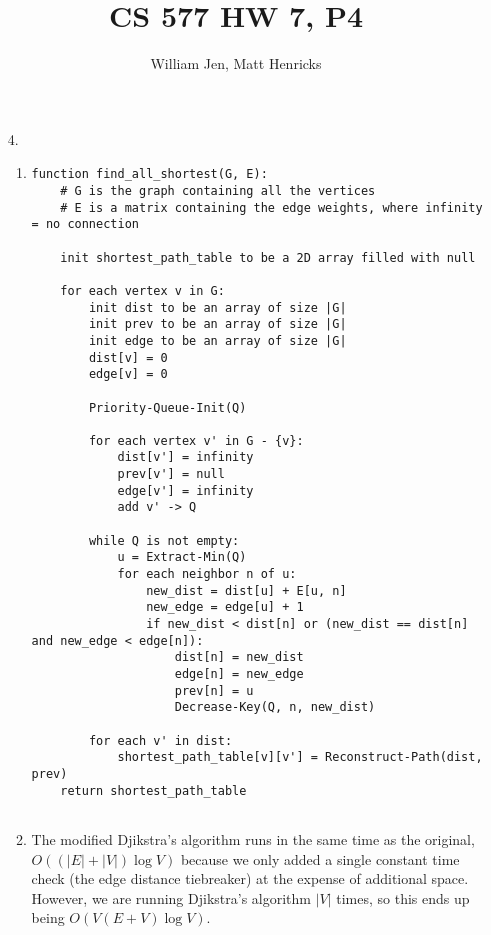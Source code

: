 \documentclass{article}
\title{CS 577 HW 7, P4}
\author{William Jen, Matt Henricks}
\date{}
\begin{document}
\maketitle

\begin{enumerate}
    \item[4.]
        \begin{enumerate}
            \item
                \begin{verbatim}
function find_all_shortest(G, E):
    # G is the graph containing all the vertices
    # E is a matrix containing the edge weights, where infinity = no connection

    init shortest_path_table to be a 2D array filled with null

    for each vertex v in G:
        init dist to be an array of size |G|
        init prev to be an array of size |G|
        init edge to be an array of size |G|
        dist[v] = 0
        edge[v] = 0
        
        Priority-Queue-Init(Q)
        
        for each vertex v' in G - {v}:
            dist[v'] = infinity
            prev[v'] = null
            edge[v'] = infinity
            add v' -> Q
            
        while Q is not empty:
            u = Extract-Min(Q)
            for each neighbor n of u:
                new_dist = dist[u] + E[u, n]
                new_edge = edge[u] + 1
                if new_dist < dist[n] or (new_dist == dist[n] and new_edge < edge[n]):
                    dist[n] = new_dist
                    edge[n] = new_edge
                    prev[n] = u
                    Decrease-Key(Q, n, new_dist)
                    
        for each v' in dist:
            shortest_path_table[v][v'] = Reconstruct-Path(dist, prev)
    return shortest_path_table
                
                \end{verbatim}
            \item The modified Djikstra's algorithm runs in the same time as the original, $O\left(\left(|E| + |V|\right)\log V\right)$
                because we only added a single constant time check (the edge distance tiebreaker) at the expense of additional space.
                However, we are running Djikstra's algorithm $|V|$ times, so this ends up being $O\left(V\left(E + V\right)\log V\right)$.
                

\end{enumerate}
\end{enumerate}
\end{document}
